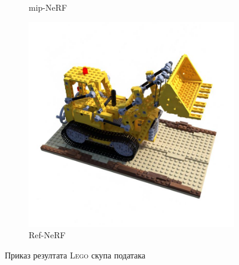 \documentclass[12pt, a4paper, twoside]{book}
\numberwithin{equation}{chapter}
\numberwithin{theorem}{section}
\numberwithin{definition}{section}
\numberwithin{definitionChapter}{chapter}
\begin{document}
\begin{figure}[H]
\begin{subfigure}{0.3\textwidth}
			\caption{mip-NeRF}
		\end{subfigure}
		\hspace*{\fill}
		\begin{subfigure}{0.3\textwidth}
			\centering
			\includegraphics[scale=0.2]{img/refnerf/refnerf_lego_31.jpg}
			\caption{Ref-NeRF}
		\end{subfigure}
		\caption{Приказ резултата \textsc{Lego} скупа података}
		\label{fig-lego-results}
	\end{figure}
\end{document}
